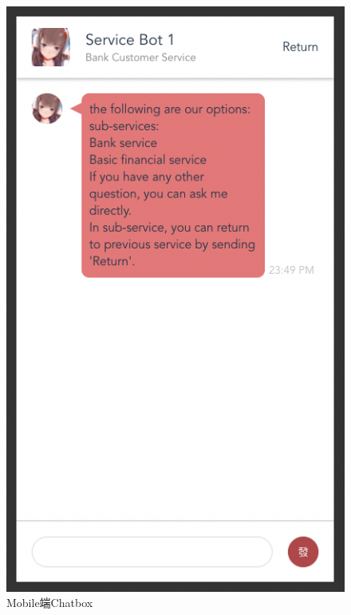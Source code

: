 \documentclass[hyperref]{ctexart}
\begin{document}
\begin{multicols}{2}
\begin{figure}[H]
        \includegraphics[scale=0.22]{figure/12.png}
        \caption{Mobile端Chatbox}
        \label{Fig.1.12}
    \end{figure}
\end{multicols}
\end{document}
